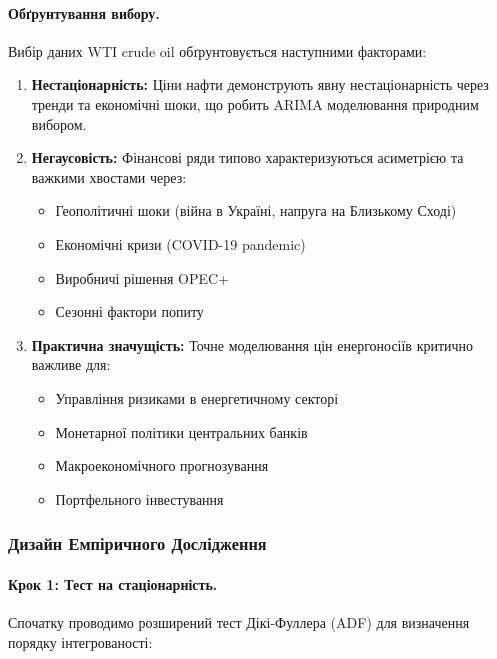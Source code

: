 \paragraph{Обґрунтування вибору.}
Вибір даних WTI crude oil обґрунтовується наступними факторами:

\begin{enumerate}
    \item \textbf{Нестаціонарність:} Ціни нафти демонструють явну нестаціонарність через тренди та економічні шоки, що робить ARIMA моделювання природним вибором.

    \item \textbf{Негаусовість:} Фінансові ряди типово характеризуються асиметрією та важкими хвостами через:
    \begin{itemize}
        \item Геополітичні шоки (війна в Україні, напруга на Близькому Сході)
        \item Економічні кризи (COVID-19 pandemic)
        \item Виробничі рішення OPEC+
        \item Сезонні фактори попиту
    \end{itemize}

    \item \textbf{Практична значущість:} Точне моделювання цін енергоносіїв критично важливе для:
    \begin{itemize}
        \item Управління ризиками в енергетичному секторі
        \item Монетарної політики центральних банків
        \item Макроекономічного прогнозування
        \item Портфельного інвестування
    \end{itemize}
\end{enumerate}

\subsubsection{Дизайн Емпіричного Дослідження}
\label{subsubsec:wti_research_design}

\paragraph{Крок 1: Тест на стаціонарність.}
Спочатку проводимо розширений тест Дікі-Фуллера (ADF) для визначення порядку інтегрованості:


